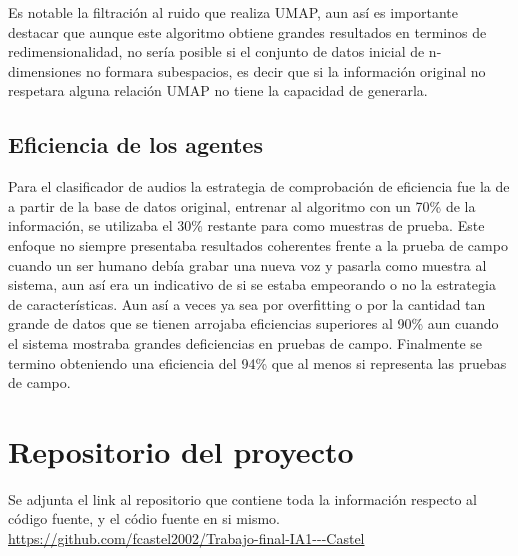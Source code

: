 \documentclass[12pt,a4paper]{article}
\begin{document}
Es notable la filtración al ruido que realiza UMAP, aun así es importante destacar que aunque este algoritmo obtiene grandes resultados en terminos de redimensionalidad, no sería posible si el conjunto de datos inicial de n-dimensiones no formara subespacios, es decir que si la información original no respetara alguna relación UMAP no tiene la capacidad de generarla.
\newpage
\subsection{Eficiencia de los agentes}
Para el clasificador de audios la estrategia de comprobación de eficiencia fue la de a partir de la base de datos original, entrenar al algoritmo con un 70\% de la información, se utilizaba el 30\% restante para como muestras de prueba. Este enfoque no siempre presentaba resultados coherentes frente a la prueba de campo cuando un ser humano debía grabar una nueva voz y pasarla como muestra al sistema, aun así era un indicativo de si se estaba empeorando o no la estrategia de características.
Aun así a veces ya sea por overfitting o por la cantidad tan grande de datos que se tienen arrojaba eficiencias superiores al 90\% aun cuando el sistema mostraba grandes deficiencias en pruebas de campo. \newline Finalmente se termino obteniendo una eficiencia del 94\% que al menos si representa las pruebas de campo.

\section{Repositorio del proyecto}
Se adjunta el link al repositorio que contiene toda la información respecto al código fuente, y el códio fuente en si mismo. \newline 
\url{https://github.com/fcastel2002/Trabajo-final-IA1---Castel }

\newpage

\end{document}
